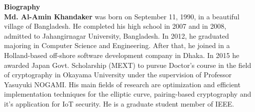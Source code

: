 \newpage
\pagestyle{plain}
\textbf{\huge Biography}
\vspace{10mm}\\

{\bf Md. Al-Amin Khandaker}{ was born on September 11, 1990, in a beautiful village of Bangladesh. He completed his high school in 2007 and in 2008, admitted to Jahangirnagar University, Bangladesh. In 2012, he graduated majoring in Computer Science and Engineering. After that, he joined in a Holland-based off-shore software development company in Dhaka. In 2015 he awarded Japan Govt. Scholarship (MEXT) to pursue Doctor’s course in the field of cryptography in Okayama University under the supervision of Professor Yasuyuki NOGAMI. His main fields of research are optimization and efficient implementation techniques for the elliptic curve, pairing-based cryptography and it’s application for IoT security. He is a graduate student member of IEEE.}
